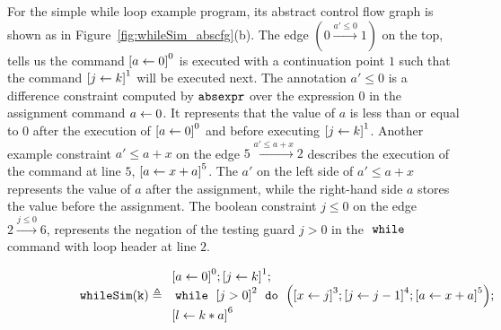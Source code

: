 \begin{example}
  \label{ex:whileSim_abscfg}
    For the simple while loop example program, 
its abstract control flow graph is shown as in Figure~\ref{fig:whileSim_abscfg}(b).
The edge $(0 \xrightarrow{a' \leq 0} 1)$ on the top, tells us the command 
$\clabel{\assign{a}{0}}^0$ is executed with a continuation point $1$ such that the
command $\clabel{\assign{j}{k}}^1$ will be executed next.
The annotation $a' \leq 0$ is a difference constraint 
computed by $\mathtt{abs}{\mathtt{expr}}$ over
the expression $0$ in the assignment command $\mathrel{ a \leftarrow 0 }$.
It represents that the value of $a$ is less than or equal to $0$ after the
execution of $\clabel{\assign{a}{0}}^0$ and before executing $\clabel{\assign{j}{k}}^1$.
Another example constraint $a' \leq a+x $ on the edge $5 \xrightarrow{a' \leq a + x } 2$ describes the execution of
 the command at line $5$, 
$\clabel{\assign{a}{x + a}}^{5}$. 
The $a'$ on the left side of $a' \leq a+x$ represents the value of $a$ after the assignment,
while the right-hand side $a$ stores the value before the assignment.
The boolean constraint $j \leq 0 $ on the edge $2 \xrightarrow{j \leq 0} 6$, 
represents the negation of the testing guard $j > 0$
in the $\;\mathtt{while}\;$ command with loop header at line $2$.
%
\begin{figure} 
  \centering
  \begin{subfigure}{.7\textwidth}
  \begin{centering}
  {\small
  $
  \kw{whileSim(k)} \triangleq
    \begin{array}{l}
        \clabel{ \assign{a}{0}}^{0} ;   
              \clabel{\assign{j}{k} }^{1} ;\\
              \ewhile ~ \clabel{j > 0}^{2} ~ \edo ~ 
              \Big(
               \clabel{\assign{x}{j} }^{3}  ;
               \clabel{\assign{j}{j-1}}^{4} ;
              \clabel{\assign{a}{x + a}}^{5}  \Big);\\
              \clabel{\assign{l}{k * a} }^{6}
          \end{array}
  $
  }
  \caption{}
  \end{centering}
  \end{subfigure}
    \begin{subfigure}{.45\textwidth}
    \begin{centering}

\end{centering}
\end{subfigure}
\end{figure}
\end{example}
